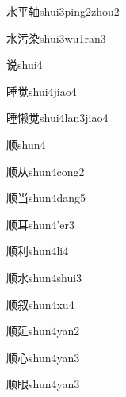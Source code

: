 \begin{verbete}[4;5;9]{水平轴}{shui3ping2zhou2}
\end{verbete}
\begin{verbete}[4;6;9]{水污染}{shui3wu1ran3}
\end{verbete}
\begin{verbete}[9]{说}{shui4}
\end{verbete}
\begin{verbete}[13;9]{睡觉}{shui4jiao4}
\end{verbete}
\begin{verbete}[14;16;9]{睡懒觉}{shui4lan3jiao4}
\end{verbete}
\begin{verbete}[9]{顺}{shun4}
\end{verbete}
\begin{verbete}[9;4]{顺从}{shun4cong2}
\end{verbete}
\begin{verbete}[9;6]{顺当}{shun4dang5}
\end{verbete}
\begin{verbete}[9;6]{顺耳}{shun4'er3}
\end{verbete}
\begin{verbete}[9;7]{顺利}{shun4li4}
\end{verbete}
\begin{verbete}[9;4]{顺水}{shun4shui3}
\end{verbete}
\begin{verbete}[9;9]{顺叙}{shun4xu4}
\end{verbete}
\begin{verbete}[9;6]{顺延}{shun4yan2}
\end{verbete}
\begin{verbete}[9;4]{顺心}{shun4yan3}
\end{verbete}
\begin{verbete}[9;11]{顺眼}{shun4yan3}
\end{verbete}

